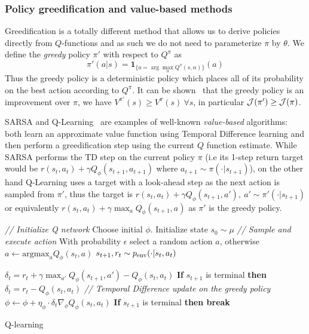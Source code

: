 \subsubsection{Policy greedification and value-based methods}
\label{subsec:qlearning}
Greedification is a totally different method that allows us to derive policies directly from $Q$-functions and as such we do not need to parameterize $\pi$ by $\theta$.
We define the \emph{greedy} policy $\pi'$ with respect to $Q^\pi$ as
\begin{equation}
\label{eq:greedification}
    \pi'(a|s) = \mathbf{1}_{\{a=\arg \max_\alpha Q^\pi(s,\alpha)\} }(a)
\end{equation}
Thus the greedy policy is a deterministic policy which places all of its probability on the best action according to $Q^\pi$. It can be shown~\citep{sutton18book} that the greedy policy is an improvement over $\pi$, we have $V^{\pi'}(s) \ge V^\pi(s)\ \forall s$, in particular ${\mathcal{J}}(\pi') \ge {\mathcal{J}}(\pi)$.

SARSA and Q-Learning~\citep{watkins1992q} are examples of well-known \emph{value-based} algorithms: both learn an approximate value function using Temporal Difference learning and then perform a greedification step using the current $Q$ function estimate. While SARSA performs the TD step on the current policy $\pi$ (i.e its 1-step return target would be $r(s_t, a_t) + \gamma Q_\phi(s_{t+1}, a_{t+1})$ where $a_{t+1} \sim \pi(\cdot|s_{t+1})$), on the other hand Q-Learning uses a target with a look-ahead step as the next action is sampled from $\pi'$, thus the target is  $r(s_{t}, a_t) + \gamma Q_\phi(s_{t+1}, a'), \ a' \sim \pi'(\cdot|s_{t+1})$ or equivalently $r(s_t, a_t) + \gamma \max_a Q_\phi(s_{t+1}, a)$ as $\pi'$ is the greedy policy.


\begin{algorithm}
\begin{algorithmic}[1]
\STATE \textit{// Initialize Q network}
\STATE Choose initial $\phi$.
    \STATE Initialize state $s_0 \sim \mu$
        \STATE \textit{// Sample and execute action}
        \STATE With probability $\epsilon$ select a random action $a$, otherwise $a \leftarrow \text{argmax}_a Q_\phi(s_t, a)$
        \STATE $s_{t+1}, r_t \sim p_{\text{env}}(\cdot | s_t, a_t)$

        \STATE $\delta_t = r_t + \gamma \max_{a'} Q_{\phi}(s_{t+1}, a') -
        Q_{\phi}(s_t, a_t)$
        \STATE \textbf{If} $s_{t+1}$ is terminal \textbf{then }$\delta_t = r_t - Q_{\phi}(s_t, a_t)$
        \STATE \textit{// Temporal Difference update on the greedy policy}
        \STATE $\phi \leftarrow {\phi} + \eta_\phi \cdot \delta_t \nabla_{\phi} Q_{\phi}(s_t, a_t) $
        \STATE \textbf{If} $s_{t+1}$ is terminal \textbf{then break}
    \ENDFOR
\ENDFOR
\end{algorithmic}
\caption{Q-learning}
\label{alg:q_learning}
\end{algorithm}

